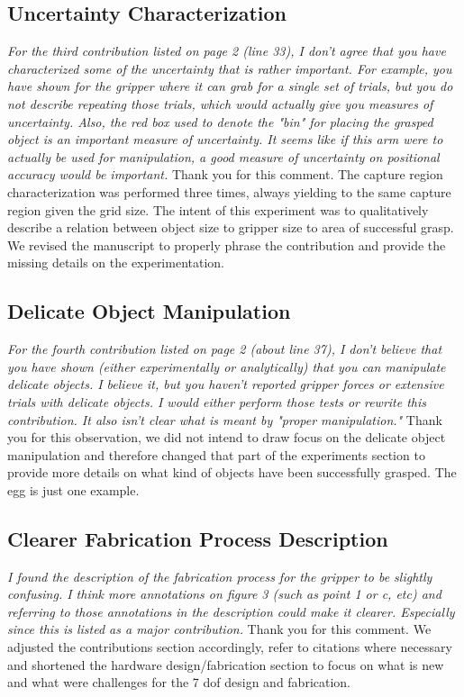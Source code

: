 \documentclass[letterpaper, 10 pt, twocolumn, conference]{article}
\begin{document}
\subsection{Uncertainty Characterization}
\textit{For the third contribution listed on page 2 (line 33), I don't agree that you have characterized some of the uncertainty that is rather important. For example, you have shown for the gripper where it can grab for a single set of trials, but you do not describe repeating those trials, which would actually give you measures of uncertainty. Also, the red box used to denote the "bin" for placing the grasped object is an important measure of uncertainty. It seems like if this arm were to actually be used for manipulation, a good measure of uncertainty on positional accuracy would be important.}
%
Thank you for this comment. The capture region characterization was performed three times, always yielding to the same capture region given the grid size. The intent of this experiment was to qualitatively describe a relation between object size to gripper size to area of successful grasp. 
We revised the manuscript to properly phrase the contribution and provide the missing details on the experimentation.
%
\subsection{Delicate Object Manipulation}
\textit{For the fourth contribution listed on page 2 (about line 37), I don't believe that you have shown (either experimentally or analytically) that you can manipulate delicate objects. I believe it, but you haven't reported gripper forces or extensive trials with delicate objects. I would either perform those tests or rewrite this contribution. It also isn't clear what is meant by "proper manipulation."}
%
Thank you for this observation, we did not intend to draw focus on the delicate object manipulation and therefore changed that part of the experiments section to provide more details on what kind of objects have been successfully grasped. The egg is just one example. %
\subsection{Clearer Fabrication Process Description}
\textit{I found the description of the fabrication process for the gripper to be slightly confusing. I think more annotations on figure 3 (such as point 1 or c, etc) and referring to those annotations in the description could make it clearer. Especially since this is listed as a major contribution.}
%
Thank you for this comment. We adjusted the contributions section accordingly, refer to citations where necessary and shortened the hardware design/fabrication section to focus on what is new and what were challenges for the 7 dof design and fabrication.
%
\end{document}
